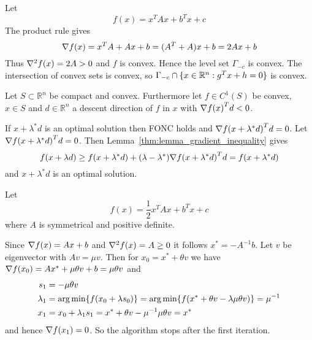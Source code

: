 Let 
\[
    f(x) = x^{T}Ax + b^{T}x + c 
\]
\proof{}
The product rule gives 
\[ 
    \nabla {f(x)} = x^{T}A + Ax + b = (A^{T} + A)x + b = 2Ax + b 
\] 
Thus \( \nabla^2 {f(x)} = 2A > 0 \) and \( f \) is convex. Hence the level set \( \Gamma_{-c} \) is convex.
The intersection of convex sets is convex, so \( \Gamma_{-c} \cap \{ x \in \mathbb{R}^n: g^{T}x + h = 0 \} \)
is convex.

Let \( S \subset \mathbb{R}^n \) be compact and convex. Furthermore let \( f \in C^1(S) \) be convex,
\( x \in S \) and \( d \in \mathbb{R}^n \) a descent direction of \( f \) in \( x \) 
with \( \nabla {f(x)}^T d < 0 \).

\proof{}
If  \( x + \lambda^* d \) is an optimal solution then FONC holds and \( \nabla {f(x + \lambda^* d)}^T d = 0 \).
Let \( \nabla {f(x + \lambda^* d)}^T d = 0 \). Then Lemma~\ref{thm:lemma_gradient_inequality} gives 
\[
    f(x + \lambda d) \ge f(x + \lambda^* d) + (\lambda - \lambda^*) \nabla {f(x + \lambda^* d)}^T d 
        = f(x + \lambda^* d) 
\]
and \( x + \lambda^* d \) is an optimal solution.


Let 
\[
       f(x) = \frac{1}{2} x^T{A}x + b^T x + c
\]
where \( A \) is symmetrical and positive definite. 

\proof{}
Since \( \nabla {f(x)} = Ax + b \) and \( \nabla^2 {f(x)} = A \ge 0 \) it follows \( x^* = -A^{-1}b \).
Let \( v \) be eigenvector with \( Av = \mu v \). Then for \( x_0 = x^* + \theta v \) we have
\( \nabla {f(x_0)} = Ax^* + \mu \theta v + b = \mu \theta v \) and
\[
    \begin{split}
        s_1         & = -\mu \theta v \\
        \lambda_1   & = \operatorname*{arg\,min} \{f(x_0 + \lambda s_0)\}
                      = \operatorname*{arg\,min} \{f(x^* + \theta v - \lambda \mu \theta v )\} = \mu^{-1} \\
        x_1         & = x_0 + \lambda_1 s_1 = x^* + \theta v - \mu^{-1} \mu \theta v = x^*
    \end{split}
\]
and hence \( \nabla {f(x_1)} = 0 \). So the algorithm  stops after the first iteration.

